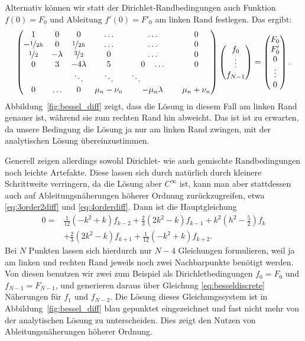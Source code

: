 Alternativ können wir statt der Dirichlet-Randbedingungen auch
Funktion $f(0) = F_0$ und Ableitung $f'(0)=F'_0$ am linken Rand
festlegen. Das ergibt:
\begin{equation}
  \begin{pmatrix}
    1 & 0         & 0         &\ldots & \ldots & 0\\
    -\nicefrac{1}{2h} & 0         & \nicefrac{1}{2h} &\ldots & \ldots & 0\\
    \nicefrac{1}{2} & -\lambda & \nicefrac{3}{2} & 0 & \ldots & 0\\
    0 & 3         & -4\lambda & 5 & 0\quad \ldots & 0\\
    & & \ddots & \ddots & \ddots\qquad\qquad \\
    0 & \ldots & 0 & \mu_n - \nu_n & -\mu_n\lambda & \mu_n + \nu_n\\
  \end{pmatrix}
  \begin{pmatrix}
    f_0\\
    \vdots\\
    f_{N-1}
  \end{pmatrix}=
  \begin{pmatrix}
    F_0\\
    F'_0\\
    0\\
    \vdots\\
    0 \\
  \end{pmatrix}.
\end{equation}
Abbildung~\ref{fig:bessel_diff} zeigt, dass die Lösung in diesem Fall
am linken Rand genauer ist, während sie zum rechten Rand hin
abweicht. Das ist ist zu erwarten, da unsere Bedingung die Lösung ja
nur am linken Rand zwingen, mit der analytischen Lösung
übereinzustimmen.

Generell zeigen allerdings sowohl Dirichlet- wie auch gemischte
Randbedingungen noch leichte Artefakte. Diese lassen sich durch
natürlich durch kleinere Schrittweite verringern, da die Lösung aber
$C^\infty$ ist, kann man aber stattdessen auch auf
Ableitungsnäherungen höherer Ordnung zurückzugreifen, etwa
\eqref{eq:3order2diff} und \eqref{eq:4orderdiff}. Dann ist die
Hauptgleichung
\begin{align}
  0 = &\frac{1}{12}(-k^2 + k)f_{k-2}
  + \frac{2}{3}(2k^2 - k)f_{k-1}
  + k^2\left(h^2 - \frac{5}{2}\right)f_k\nonumber\\
  &+ \frac{2}{3}(2k^2 - k)f_{k+1}
  + \frac{1}{12}(-k^2 + k)f_{k+2}.
\end{align}
Bei $N$ Punkten lassen sich hierdurch nur $N-4$ Gleichungen
formulieren, weil ja am linken und rechten Rand jeweils noch zwei
Nachbarpunkte benötigt werden. Von diesen benutzen wir zwei zum
Beispiel als Dirichletbedingungen $f_0 = F_0$ und $f_{N-1} = F_{N-1}$,
und generieren daraus über Gleichung \eqref{eq:besseldiscrete}
Näherungen für $f_1$ und $f_{N-2}$. Die Lösung dieses Gleichungssystem
ist in Abbildung~\ref{fig:bessel_diff} blau gepunktet eingezeichnet
und fast nicht mehr von der analytischen Lösung zu unterscheiden. Dies
zeigt den Nutzen von Ableitungsnäherungen höherer Ordnung.

